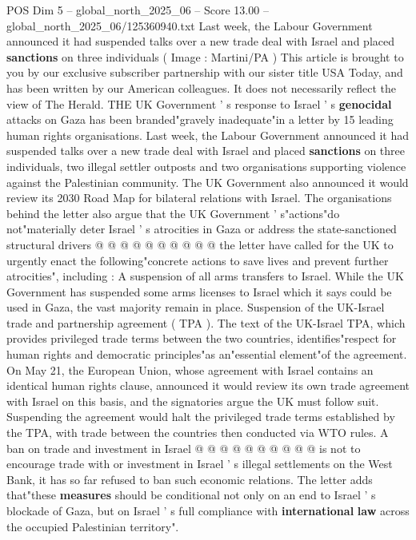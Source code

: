 \begin{textsample}{POS Dim 5 – global\_north\_2025\_06 – Score 13.00 – global\_north\_2025\_06/125360940.txt}  \label{ex:f5_pos_090}
Last week, the Labour Government announced it had suspended talks over a new trade deal with Israel and placed \textbf{sanctions} on three individuals ( Image : Martini/PA ) This article is brought to you by our exclusive subscriber partnership with our sister title USA Today, and has been written by our American colleagues.
It does not necessarily reflect the view of The Herald.
THE UK Government ' s response to Israel ' s \textbf{genocidal} attacks on Gaza has been branded"gravely inadequate"in a letter by 15 leading human rights organisations.
Last week, the Labour Government announced it had suspended talks over a new trade deal with Israel and placed \textbf{sanctions} on three individuals, two illegal settler outposts and two organisations supporting violence against the Palestinian community.
The UK Government also announced it would review its 2030 Road Map for bilateral relations with Israel.
The organisations behind the letter also argue that the UK Government ' s"actions"do not"materially deter Israel ' s atrocities in Gaza or address the state-sanctioned structural drivers @ @ @ @ @ @ @ @ @ @ the letter have called for the UK to urgently enact the following"concrete actions to save lives and prevent further atrocities", including : A suspension of all arms transfers to Israel.
While the UK Government has suspended some arms licenses to Israel which it says could be used in Gaza, the vast majority remain in place.
Suspension of the UK-Israel trade and partnership agreement ( TPA ).
The text of the UK-Israel TPA, which provides privileged trade terms between the two countries, identifies"respect for human rights and democratic principles"as an"essential element"of the agreement.
On May 21, the European Union, whose agreement with Israel contains an identical human rights clause, announced it would review its own trade agreement with Israel on this basis, and the signatories argue the UK must follow suit.
Suspending the agreement would halt the privileged trade terms established by the TPA, with trade between the countries then conducted via WTO rules.
A ban on trade and investment in Israel @ @ @ @ @ @ @ @ @ @ is not to encourage trade with or investment in Israel ' s illegal settlements on the West Bank, it has so far refused to ban such economic relations.
The letter adds that"these \textbf{measures} should be conditional not only on an end to Israel ' s blockade of Gaza, but on Israel ' s full compliance with \textbf{international} \textbf{law} across the occupied Palestinian territory".

\end{textsample}
